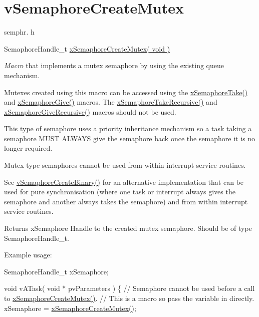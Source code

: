 \hypertarget{group__v_semaphore_create_mutex}{}\section{v\+Semaphore\+Create\+Mutex}
\label{group__v_semaphore_create_mutex}
semphr. h 
\begin{DoxyPre}SemaphoreHandle\_t \hyperlink{semphr_8h_aa6a00aa9b91a9e5b3ebe4ae1c3f115c6}{xSemaphoreCreateMutex( void )}\end{DoxyPre}


{\itshape Macro} that implements a mutex semaphore by using the existing queue mechanism.

Mutexes created using this macro can be accessed using the \hyperlink{semphr_8h_af116e436d2a5ae5bd72dbade2b5ea930}{x\+Semaphore\+Take()} and \hyperlink{semphr_8h_aae55761cabfa9bf85c8f4430f78c0953}{x\+Semaphore\+Give()} macros. The \hyperlink{semphr_8h_ad395f4bba51eea6af3397d72bc079e4d}{x\+Semaphore\+Take\+Recursive()} and \hyperlink{semphr_8h_a398d66b17856c22dd49d39aaac42f105}{x\+Semaphore\+Give\+Recursive()} macros should not be used.

This type of semaphore uses a priority inheritance mechanism so a task \textquotesingle{}taking\textquotesingle{} a semaphore M\+U\+ST A\+L\+W\+A\+YS \textquotesingle{}give\textquotesingle{} the semaphore back once the semaphore it is no longer required.

Mutex type semaphores cannot be used from within interrupt service routines.

See \hyperlink{semphr_8h_ae10bffadd26fbd5bcce76bf33a83ef30}{v\+Semaphore\+Create\+Binary()} for an alternative implementation that can be used for pure synchronisation (where one task or interrupt always \textquotesingle{}gives\textquotesingle{} the semaphore and another always \textquotesingle{}takes\textquotesingle{} the semaphore) and from within interrupt service routines.

\begin{DoxyReturn}{Returns}
x\+Semaphore Handle to the created mutex semaphore. Should be of type Semaphore\+Handle\+\_\+t.
\end{DoxyReturn}
Example usage\+: 
\begin{DoxyPre}
SemaphoreHandle\_t xSemaphore;\end{DoxyPre}



\begin{DoxyPre}void vATask( void * pvParameters )
\{
   // Semaphore cannot be used before a call to \hyperlink{semphr_8h_aa6a00aa9b91a9e5b3ebe4ae1c3f115c6}{xSemaphoreCreateMutex()}.
   // This is a macro so pass the variable in directly.
   xSemaphore = \hyperlink{semphr_8h_aa6a00aa9b91a9e5b3ebe4ae1c3f115c6}{xSemaphoreCreateMutex()};\end{DoxyPre}



